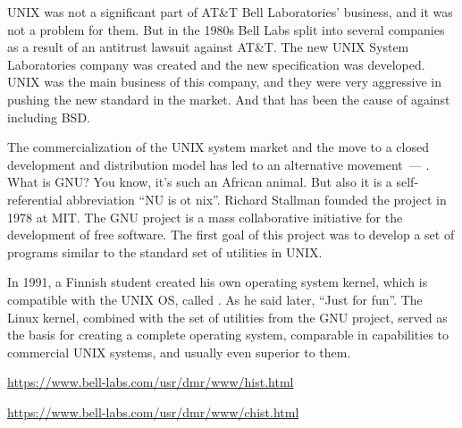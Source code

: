 UNIX was not a significant part of AT\&T Bell Laboratories' business,
and it was not a problem for them. But in the 1980s Bell Labs split
into several companies as a result of an antitrust lawsuit against AT\&T.
The new UNIX System Laboratories company was created and the new
 specification was developed. UNIX was the main business
of this company, and they were very aggressive in pushing the new standard in
the market. And that has been the cause of  against
 including BSD.

The commercialization of the UNIX system market and the move to a closed
development and distribution model has led to an alternative movement~---
. What is GNU? You know, it's such an African animal. But also it
is a self-referential abbreviation ``NU is ot nix''.
Richard Stallman founded the project in 1978 at MIT. The GNU project is a mass
collaborative initiative for the development of free software. The first
goal of this project was to develop a set of programs similar to
the standard set of utilities in UNIX.

In 1991, a Finnish student  created his own operating
system kernel, which is compatible with the UNIX OS, called .
As he said later, ``Just for fun''. The Linux kernel, combined with the set of
utilities from the GNU project, served as the basis for creating a complete
operating system, comparable in capabilities to commercial UNIX systems,
and usually even superior to them.

\medskip
\href{https://www.bell-labs.com/usr/dmr/www/hist.html}%
{\url{https://www.bell-labs.com/usr/dmr/www/hist.html}}

\noindent
\href{https://www.bell-labs.com/usr/dmr/www/chist.html}%
{\url{https://www.bell-labs.com/usr/dmr/www/chist.html}}
